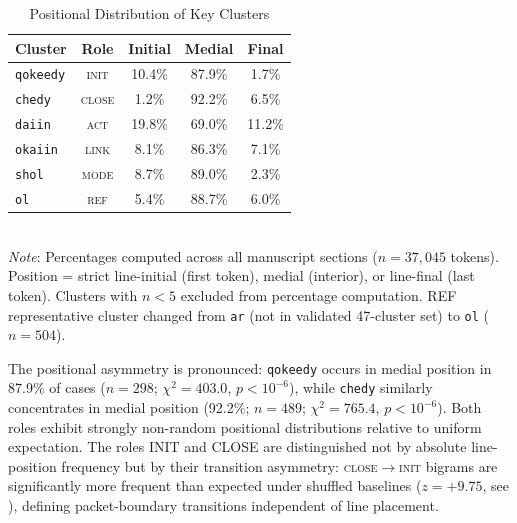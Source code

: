 \documentclass[11pt,a4paper,twocolumn]{article}
\begin{document}
\begin{table}[H]
\centering
\caption{Positional Distribution of Key Clusters}
\label{tab:positional}
\small
\begin{tabular}{@{}lcccc@{}}
\toprule
\textbf{Cluster} & \textbf{Role} & \textbf{Initial} & \textbf{Medial} & \textbf{Final} \\
\midrule
\texttt{qokeedy} & \textsc{init} & 10.4\% & 87.9\% & 1.7\% \\
\texttt{chedy} & \textsc{close} & 1.2\% & 92.2\% & 6.5\% \\
\texttt{daiin} & \textsc{act} & 19.8\% & 69.0\% & 11.2\% \\
\texttt{okaiin} & \textsc{link} & 8.1\% & 86.3\% & 7.1\% \\
\texttt{shol} & \textsc{mode} & 8.7\% & 89.0\% & 2.3\% \\
\texttt{ol} & \textsc{ref} & 5.4\% & 88.7\% & 6.0\% \\
\bottomrule
\end{tabular}
\medskip
\\
\footnotesize\textit{Note}: Percentages computed across all manuscript sections ($n=37{,}045$ tokens). Position = strict line-initial (first token), medial (interior), or line-final (last token). Clusters with $n < 5$ excluded from percentage computation. REF representative cluster changed from \texttt{ar} (not in validated 47-cluster set) to \texttt{ol} ($n=504$).
\end{table}

\noindent The positional asymmetry is pronounced: \texttt{qokeedy} occurs in medial position in 87.9\% of cases ($n=298$; $\chi^2=403.0$, $p < 10^{-6}$), while \texttt{chedy} similarly concentrates in medial position (92.2\%; $n=489$; $\chi^2=765.4$, $p < 10^{-6}$). Both roles exhibit strongly non-random positional distributions relative to uniform expectation. The roles INIT and CLOSE are distinguished not by absolute line-position frequency but by their transition asymmetry: \textsc{close}$\to$\textsc{init} bigrams are significantly more frequent than expected under shuffled baselines ($z=+9.75$, see ), defining packet-boundary transitions independent of line placement.
\end{document}
